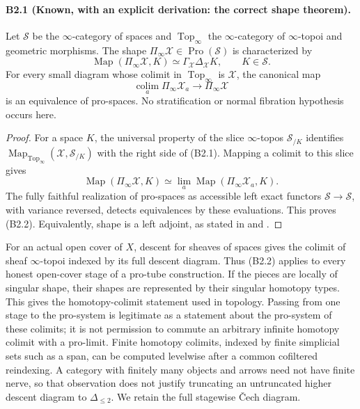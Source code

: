 \paragraph{B2.1 (Known, with an explicit derivation: the correct shape theorem).}
Let $\mathcal S$ be the $\infty$-category of spaces and
$\operatorname{Top}_\infty$ the $\infty$-category of $\infty$-topoi and
geometric morphisms. The shape $\Pi_\infty\mathcal X\in
\operatorname{Pro}(\mathcal S)$ is characterized by
\[
 \operatorname{Map}(\Pi_\infty\mathcal X,K)
  \simeq \Gamma_{\mathcal X}\Delta_{\mathcal X}K,
       \qquad K\in\mathcal S.
 \tag{B2.1}
\]
For every small diagram whose colimit in $\operatorname{Top}_\infty$
is $\mathcal X$, the canonical map
\[
 \operatorname*{colim}_a\Pi_\infty\mathcal X_a
       \longrightarrow\Pi_\infty\mathcal X
 \tag{B2.2}
\]
is an equivalence of pro-spaces. No stratification or normal
fibration hypothesis occurs here.

\begin{proof}
For a space $K$, the universal property of the slice $\infty$-topos
$\mathcal S_{/K}$ identifies
$\operatorname{Map}_{\operatorname{Top}_\infty}
(\mathcal X,\mathcal S_{/K})$ with the right side of (B2.1).
Mapping a colimit to this slice gives
\[
 \operatorname{Map}(\Pi_\infty\mathcal X,K)
 \simeq\lim_a\operatorname{Map}(\Pi_\infty\mathcal X_a,K).
\]
The fully faithful realization of pro-spaces as accessible left exact
functors $\mathcal S\to\mathcal S$, with variance reversed, detects
equivalences by these evaluations. This proves (B2.2). Equivalently,
shape is a left adjoint, as stated in
\cite[Remark 7.1.6.15]{LurieHTT} and
\cite[Definition 4.2.1]{BGHExodromy}.
\end{proof}

For an actual open cover of $X$, descent for sheaves of spaces gives
the colimit of sheaf $\infty$-topoi indexed by its full descent diagram.
Thus (B2.2) applies to every honest open-cover stage of a pro-tube
construction. If the pieces are locally of singular shape, their shapes
are represented by their singular homotopy types. This gives the
homotopy-colimit statement used in topology. Passing from one stage to
the pro-system is legitimate as a statement about the pro-system of
these colimits; it is not permission to commute an arbitrary infinite
homotopy colimit with a pro-limit. Finite homotopy colimits, indexed
by finite simplicial sets such as a span, can be computed levelwise
after a common cofiltered reindexing. A category with finitely many
objects and arrows need not have finite nerve, so that observation
does not justify truncating an untruncated higher descent diagram
to $\Delta_{\leq2}$. We retain the full stagewise \v Cech diagram.

